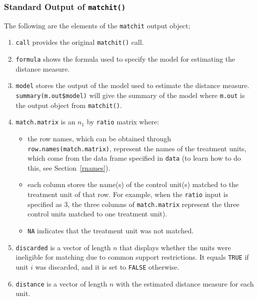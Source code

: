 \documentclass[oneside,letterpaper,titlepage]{article}
\begin{document}
\subsubsection{Standard Output of \texttt{matchit()}}

The following are the elements of the \texttt{matchit} output object;

\begin{enumerate}
  
\item \texttt{call} provides the original {\tt matchit()} call.
  
\item \texttt{formula} shows the formula used to specify the model for
  estimating the distance measure.
  
\item \texttt{model} stores the output of the model used to estimate
  the distance measure.  \texttt{summary(m.out\$model)} will give the
  summary of the model where \texttt{m.out} is the output object from
  \texttt{matchit()}.
  
\item \texttt{match.matrix} is an $n_1$ by \texttt{ratio} matrix
  where:
  \begin{itemize}
  \item the row names, which can be obtained through
    \texttt{row.names(match.matrix)}, represent the names of the
    treatment units, which come from the data frame specified in
    \texttt{data} (to learn how to do this, see Section~\ref{rnames}).
  \item each column stores the name(s) of the control unit(s) matched
    to the treatment unit of that row. For example, when the
    \texttt{ratio} input is specified as 3, the three columns of
    \texttt{match.matrix} represent the three control units matched to
    one treatment unit).
  \item \texttt{NA} indicates that the treatment unit was not matched.  
  \end{itemize}
   
\item \texttt{discarded} is a vector of length $n$ that displays
  whether the units were ineligible for matching due to common
  support restrictions.  It equals \texttt{TRUE} if unit $i$ was
  discarded, and it is set to \texttt{FALSE} otherwise.
  
\item \texttt{distance} is a vector of length $n$ with the estimated
  distance measure for each unit.
  

\end{enumerate}
\end{document}
